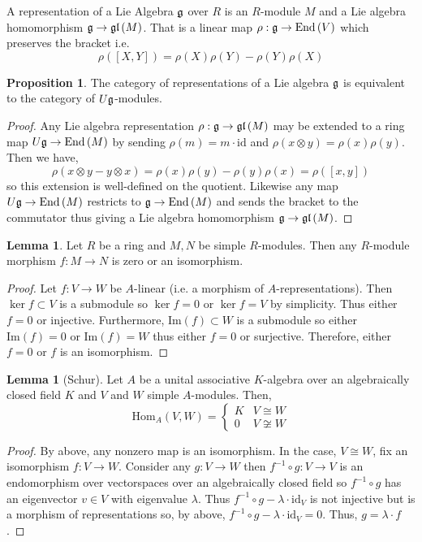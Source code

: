 \documentclass[12pt]{extarticle}
\newcommand{\id}{\mathrm{id}}
\newcommand{\catHom}[3]{\mathrm{Hom}_{#1}\left( #2, #3 \right)}
\renewcommand{\Im}[1]{\mathrm{Im}(#1)}
\theoremstyle{definition}
\newtheorem{lemma}[theorem]{Lemma}
\newtheorem{proposition}[theorem]{Proposition}
\newenvironment{definition}[1][Definition:]{\begin{trivlist}
\item[\hskip \labelsep {\bfseries #1}]}{\end{trivlist}}
\newcommand{\End}[1]{\mathrm{End}\left( #1 \right)}
\begin{document}
\begin{definition}
A representation of a  Lie Algebra $\mathfrak{g}$ over $R$ is an $R$-module $M$ and a Lie algebra homomorphism $\mathfrak{g} \to \mathfrak{gl}\left( M \right)$. That is a linear map $\rho : \g \to \End{V}$ which preserves the bracket i.e.
\[ \rho([X, Y]) = \rho(X) \rho(Y) - \rho(Y) \rho(X) \]
\end{definition}


\begin{proposition}
The category of representations of a Lie algebra $\mathfrak{g}$ is equivalent to  the category of $U \mathfrak{g}$-modules. 
\end{proposition}

\begin{proof}
Any Lie algebra representation $\rho : \mathfrak{g} \to \mathfrak{gl}\left( M \right)$ may be extended to a ring map $U \g \to \End{M}$ by sending $\rho(m) = m \cdot \id$ and $\rho(x \otimes y) = \rho(x) \rho(y)$. Then we have,
\[ \rho(x \otimes y - y \otimes x) = \rho(x) \rho(y) - \rho(y) \rho(x) = \rho([x, y]) \]
so this extension is well-defined on the quotient. Likewise any map $U \g \to \End{M}$ restricts to $\g \to \End{M}$ and sends the bracket to the commutator thus giving a Lie algebra homomorphism $\mathfrak{g} \to \mathfrak{gl}\left( M \right)$.
\end{proof}

\begin{lemma}
Let $R$ be a ring and $M, N$ be simple $R$-modules. Then any $R$-module morphism $f : M \to N$ is zero or an isomorphism.
\end{lemma}

\begin{proof}
Let $f : V \to W$ be $A$-linear (i.e. a morphism of $A$-representations). Then $\ker{f} \subset V$ is a submodule so $\ker{f} = 0$ or $\ker{f} = V$ by simplicity. Thus either $f = 0$ or injective. Furthermore, $\Im{f} \subset W$ is a submodule so either $\Im{f} = 0$ or $\Im{f} = W$ thus either $f = 0$ or surjective. Therefore, either $f = 0$ or $f$ is an isomorphism.
\end{proof}

\begin{lemma}[Schur]
Let $A$ be a unital associative $K$-algebra over an algebraically closed field $K$ and $V$ and $W$ simple $A$-modules. Then,
\[ \catHom{A}{V}{W} = 
\begin{cases}
K & V \cong W
\\
0 & V \not\cong W
\end{cases} \]
\end{lemma}

\begin{proof}
By above, any nonzero map is an isomorphism.
In the case, $V \cong W$, fix an isomorphism $f : V \to W$. Consider any $g : V \to W$ then $f^{-1} \circ g : V \to V$ is an endomorphism over vectorspaces over an algebraically closed field so $f^{-1} \circ g$ has an eigenvector $v \in V$ with eigenvalue $\lambda$. Thus $f^{-1} \circ g - \lambda \cdot \id_V$ is not injective but is a morphism of representations so, by above, $f^{-1} \circ g - \lambda \cdot \id_V = 0$. Thus, $g = \lambda \cdot f$. 
\end{proof}
\end{document}
